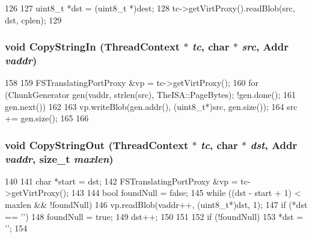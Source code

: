 \begin{DoxyCode}
126 {
127     uint8_t *dst = (uint8_t *)dest;
128     tc->getVirtProxy().readBlob(src, dst, cplen);
129 }
\end{DoxyCode}
\hypertarget{fs__translating__port__proxy_8hh_ae5894da106db9f266e5b5de9eeee5231}{
\subsubsection[{CopyStringIn}]{\setlength{\rightskip}{0pt plus 5cm}void CopyStringIn ({\bf ThreadContext} $\ast$ {\em tc}, \/  char $\ast$ {\em src}, \/  {\bf Addr} {\em vaddr})}}
\label{fs__translating__port__proxy_8hh_ae5894da106db9f266e5b5de9eeee5231}



\begin{DoxyCode}
158 {
159     FSTranslatingPortProxy &vp = tc->getVirtProxy();
160     for (ChunkGenerator gen(vaddr, strlen(src), TheISA::PageBytes); !gen.done();
161          gen.next())
162     {
163         vp.writeBlob(gen.addr(), (uint8_t*)src, gen.size());
164         src += gen.size();
165     }
166 }
\end{DoxyCode}
\hypertarget{fs__translating__port__proxy_8hh_a3dba1fb48832b9fc799b4899dcb59128}{
\subsubsection[{CopyStringOut}]{\setlength{\rightskip}{0pt plus 5cm}void CopyStringOut ({\bf ThreadContext} $\ast$ {\em tc}, \/  char $\ast$ {\em dst}, \/  {\bf Addr} {\em vaddr}, \/  size\_\-t {\em maxlen})}}
\label{fs__translating__port__proxy_8hh_a3dba1fb48832b9fc799b4899dcb59128}



\begin{DoxyCode}
140 {
141     char *start = dst;
142     FSTranslatingPortProxy &vp = tc->getVirtProxy();
143 
144     bool foundNull = false;
145     while ((dst - start + 1) < maxlen && !foundNull) {
146         vp.readBlob(vaddr++, (uint8_t*)dst, 1);
147         if (*dst == '\0')
148             foundNull = true;
149         dst++;
150     }
151 
152     if (!foundNull)
153         *dst = '\0';
154 }
\end{DoxyCode}

